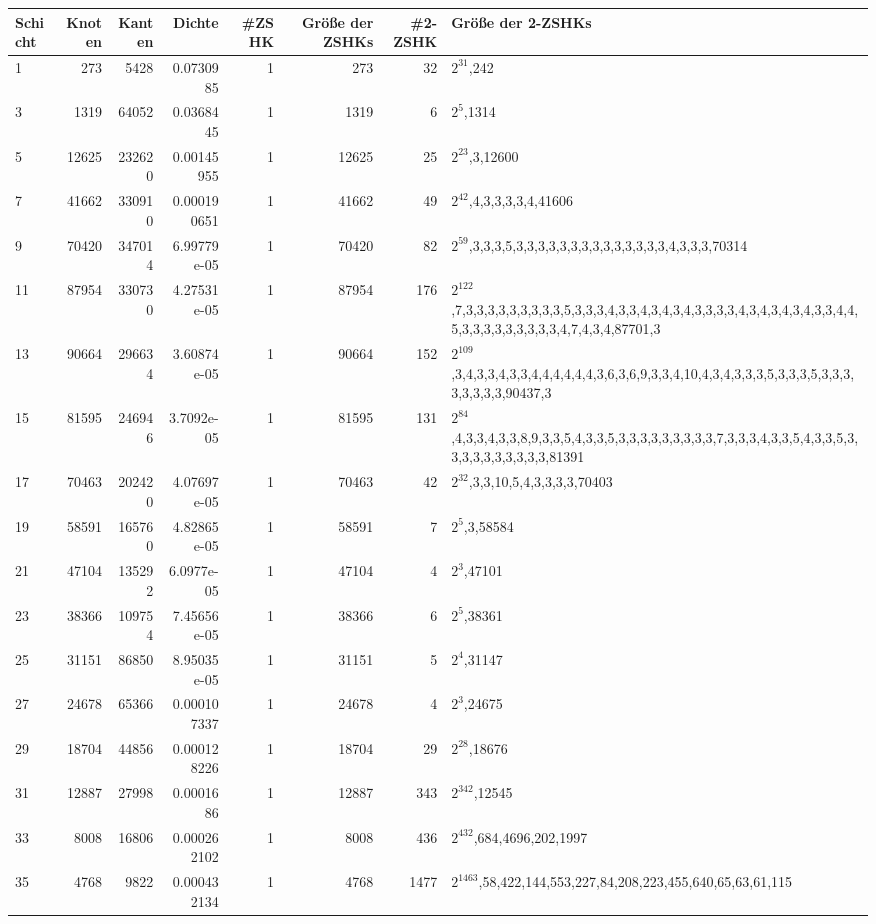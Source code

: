 \documentclass[10pt,a4paper]{standalone}
\begin{document}
\begin{tabular}{l|r|r|r|r|r|r|l|}
        Schicht & Knoten & Kanten & Dichte & \#ZSHK & Größe der ZSHKs & \#2-ZSHK & Größe der 2-ZSHKs \\ \hline
        1 & 273 & 5428 & 0.0730985 & 1 & 273 & 32 & $2^{31}$,242 \\ \hline
3 & 1319 & 64052 & 0.0368445 & 1 & 1319 & 6 & $2^{5}$,1314 \\ \hline
5 & 12625 & 232620 & 0.00145955 & 1 & 12625 & 25 & $2^{23}$,3,12600 \\ \hline
7 & 41662 & 330910 & 0.000190651 & 1 & 41662 & 49 & $2^{42}$,4,3,3,3,3,4,41606 \\ \hline
9 & 70420 & 347014 & 6.99779e-05 & 1 & 70420 & 82 & $2^{59}$,3,3,3,5,3,3,3,3,3,3,3,3,3,3,3,3,3,3,4,3,3,3,70314 \\ \hline
11 & 87954 & 330730 & 4.27531e-05 & 1 & 87954 & 176 & $2^{122}$,7,3,3,3,3,3,3,3,3,3,5,3,3,3,4,3,3,4,3,4,3,4,3,3,3,3,4,3,4,3,4,3,4,3,3,4,4,5,3,3,3,3,3,3,3,3,3,4,7,4,3,4,87701,3 \\ \hline
13 & 90664 & 296634 & 3.60874e-05 & 1 & 90664 & 152 & $2^{109}$,3,4,3,3,4,3,3,4,4,4,4,4,4,3,6,3,6,9,3,3,4,10,4,3,4,3,3,3,5,3,3,3,5,3,3,3,3,3,3,3,3,90437,3 \\ \hline
15 & 81595 & 246946 & 3.7092e-05 & 1 & 81595 & 131 & $2^{84}$,4,3,3,4,3,3,8,9,3,3,5,4,3,3,5,3,3,3,3,3,3,3,3,3,7,3,3,3,4,3,3,5,4,3,3,5,3,3,3,3,3,3,3,3,3,3,81391 \\ \hline
17 & 70463 & 202420 & 4.07697e-05 & 1 & 70463 & 42 & $2^{32}$,3,3,10,5,4,3,3,3,3,70403 \\ \hline
19 & 58591 & 165760 & 4.82865e-05 & 1 & 58591 & 7 & $2^{5}$,3,58584 \\ \hline
21 & 47104 & 135292 & 6.0977e-05 & 1 & 47104 & 4 & $2^{3}$,47101 \\ \hline
23 & 38366 & 109754 & 7.45656e-05 & 1 & 38366 & 6 & $2^{5}$,38361 \\ \hline
25 & 31151 & 86850 & 8.95035e-05 & 1 & 31151 & 5 & $2^{4}$,31147 \\ \hline
27 & 24678 & 65366 & 0.000107337 & 1 & 24678 & 4 & $2^{3}$,24675 \\ \hline
29 & 18704 & 44856 & 0.000128226 & 1 & 18704 & 29 & $2^{28}$,18676 \\ \hline
31 & 12887 & 27998 & 0.0001686 & 1 & 12887 & 343 & $2^{342}$,12545 \\ \hline
33 & 8008 & 16806 & 0.000262102 & 1 & 8008 & 436 & $2^{432}$,684,4696,202,1997 \\ \hline
35 & 4768 & 9822 & 0.000432134 & 1 & 4768 & 1477 & $2^{1463}$,58,422,144,553,227,84,208,223,455,640,65,63,61,115 \\ \hline

\end{tabular}
\end{document}
